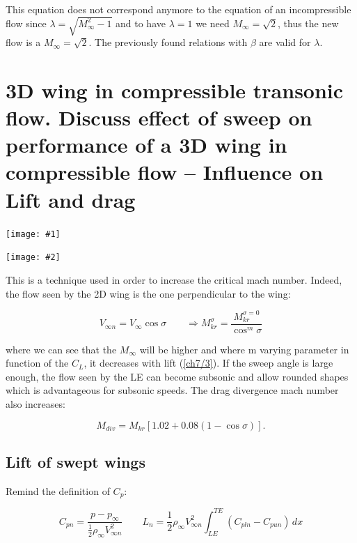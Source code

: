\documentclass[british,french,11pt, a4paper, openany]{article}
\newcommand{\minifig}[6]{
	\begin{center}%
		\begin{minipage}{#5\textwidth}%
			\texttt{[image: \#1]}%
			\captionof{figure}{}%
			\label{#1}%
		\end{minipage}%
		\begin{minipage}{#6\textwidth}%
			\texttt{[image: \#2]}%
			\captionof{figure}{}%
			\label{#2}%
		\end{minipage}%
	\end{center}
}
\begin{document}
This equation does not correspond anymore to the equation of an incompressible flow since $\lambda = \sqrt{M_\infty ^2 - 1}$ and to have $\lambda = 1$ we need $M_\infty = \sqrt{2}$, thus the new flow is a $M_\infty = \sqrt{2}$. The previously found relations with $\beta$ are valid for $\lambda$.




\section{3D wing in compressible transonic flow. Discuss effect of sweep on performance of a 3D wing in compressible flow -- Influence on Lift and drag}

\minifig{ch7/2}{ch7/3}{0.15}{0.15}{0.3}{0.3}
This is a technique used in order to increase the critical mach number. Indeed, the flow seen by the 2D wing is the one perpendicular to the wing:

\begin{equation}
V_{\infty n} = V_{\infty}\cos \sigma \qquad \Rightarrow M_{kr}^\sigma= \frac{M_{kr}^{\sigma = 0}}{\cos^m \sigma}
\end{equation}

where we can see that the $M_\infty$ will be higher and where m varying parameter in function of the $C_L$, it decreases with lift (\autoref{ch7/3}). If the sweep angle is large enough, the flow seen by the LE can become subsonic and allow rounded shapes which is advantageous for subsonic speeds. The drag divergence mach number also increases:

\begin{equation}
M_{div} = M_{kr} [1.02 + 0.08 (1-\cos \sigma)].
\end{equation}

\subsection{Lift of swept wings}
Remind the definition of $C_p$: 

\begin{equation}
C_{pn} = \frac{p-p_\infty}{\frac{1}{2} \rho _\infty V_{\infty n} ^2} \qquad L_n = \frac{1}{2}\rho _\infty V_{\infty n} ^2 \int _{LE} ^{TE} (C_{pln} - C_{pun}) \, dx 
\end{equation}
\end{document}
